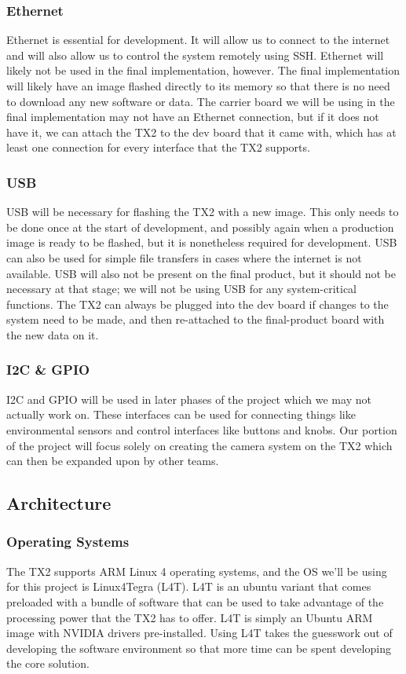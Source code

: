\documentclass[letterpaper,10pt,serif,draftclsnofoot,onecolumn,compsoc,titlepage]{IEEEtran}
\begin{document}
\subsubsection{Ethernet}
Ethernet is essential for development. It will allow us to connect to the internet and will also allow us to control the system remotely using SSH. Ethernet will likely not be used in the final implementation, however. The final implementation will likely have an image flashed directly to its memory so that there is no need to download any new software or data. The carrier board we will be using in the final implementation may not have an Ethernet connection, but if it does not have it, we can attach the TX2 to the dev board that it came with, which has at least one connection for every interface that the TX2 supports.

\subsubsection{USB}
USB will be necessary for flashing the TX2 with a new image. This only needs to be done once at the start of development, and possibly again when a production image is ready to be flashed, but it is nonetheless required for development. USB can also be used for simple file transfers in cases where the internet is not available. USB will also not be present on the final product, but it should not be necessary at that stage; we will not be using USB for any system-critical functions. The TX2 can always be plugged into the dev board if changes to the system need to be made, and then re-attached to the final-product board with the new data on it.

\subsubsection{I2C \& GPIO}
I2C and GPIO will be used in later phases of the project which we may not actually work on. These interfaces can be used for connecting things like environmental sensors and control interfaces like buttons and knobs. Our portion of the project will focus solely on creating the camera system on the TX2 which can then be expanded upon by other teams.

\subsection{Architecture}
\subsubsection{Operating Systems}
The TX2 supports ARM Linux 4 operating systems, and the OS we’ll be using for this project is Linux4Tegra (L4T). L4T is an ubuntu variant that comes preloaded with a bundle of software that can be used to take advantage of the processing power that the TX2 has to offer. L4T is simply an Ubuntu ARM image with NVIDIA drivers pre-installed. Using L4T takes the guesswork out of developing the software environment so that more time can be spent developing the core solution.
\end{document}

